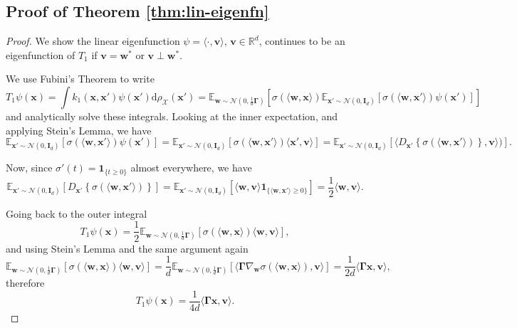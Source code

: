 \subsection{Proof of Theorem \ref{thm:lin-eigenfn}}\label{app:thm-lin-eigenfn}

\begin{proof}


    We show the linear eigenfunction $\psi = \langle \cdot ,\bm v\rangle$, $\bm v \in \mathbb R^d$, continues to be an eigenfunction of $T_1$ if $\bm v = \bm w^*$ or $\bm v \perp \bm w^*$. 
    
    We use Fubini's Theorem to write
    \[
        T_1 \psi(\bm x) = \int k_1(\bm x, \bm x')\psi(\bm x')\mathrm d \rho_{\mathcal X}(\bm x') = \mathbb E_{\bm w \sim \mathcal N(0, \frac{1}{d} \bm \Gamma)}[\sigma(\langle \bm w, \bm x\rangle) \mathbb E_{\bm x' \sim \mathcal N(0, \bm I_d)}[\sigma(\langle \bm w, \bm x'\rangle)\psi(\bm x')]]
    \]
    and analytically solve these integrals. Looking at the inner expectation, and applying Stein's Lemma, we have
    \[
        \mathbb E_{\bm x' \sim \mathcal N(0, \bm I_d)}[\sigma(\langle \bm w, \bm x'\rangle)\psi(\bm x')] = \mathbb E_{\bm x' \sim \mathcal N(0, \bm I_d)}[\sigma(\langle \bm w, \bm x'\rangle)\langle \bm x', \bm v\rangle] = \mathbb E_{\bm x' \sim \mathcal N(0, \bm I_d)}[\langle D_{\bm x'}\left\{ \sigma(\langle \bm w, \bm x'\rangle) \right\}, \bm v\rangle)].
    \]

    Now, since $\sigma'(t) = \bm 1_{\{t \geq 0\}}$ almost everywhere, we have
    \[
        \mathbb E_{\bm x' \sim \mathcal N(0, \bm I_d)}[D_{\bm x'} \left\{ \sigma(\langle \bm w, \bm x'\rangle) \right\}] = \mathbb E_{\bm x' \sim \mathcal N(0, \bm I_d)}[\langle \bm w, \bm v\rangle \bm 1_{\{\langle \bm w, \bm x'\rangle \geq 0\}}] = \frac{1}{2}\langle \bm w, \bm v\rangle.
    \]

    Going back to the outer integral
    \[
        T_1\psi(\bm x) = \frac{1}{2}\mathbb E_{\bm w \sim \mathcal N(0, \frac{1}{d}\bm \Gamma)}[\sigma(\langle \bm w, \bm x\rangle) \langle \bm w, \bm v\rangle],
    \]
    and using Stein's Lemma and the same argument again
    \[
        \mathbb E_{\bm w \sim \mathcal N(0, \frac{1}{d}\bm \Gamma)}[\sigma(\langle \bm w, \bm x\rangle) \langle \bm w, \bm v\rangle] =  \frac{1}{d}\mathbb E_{\bm w \sim \mathcal N(0, \frac{1}{d}\bm \Gamma)}[\langle\bm \Gamma \nabla_{\bm w}\sigma(\langle \bm w, \bm x\rangle), \bm v\rangle] = \frac{1}{2{d}}\langle \bm \Gamma \bm x, \bm v\rangle, 
    \]
    therefore
    \[
        T_1\psi(\bm x) = \frac{1}{4d}\langle \bm \Gamma \bm x, \bm v\rangle.
    \]


\end{proof}
